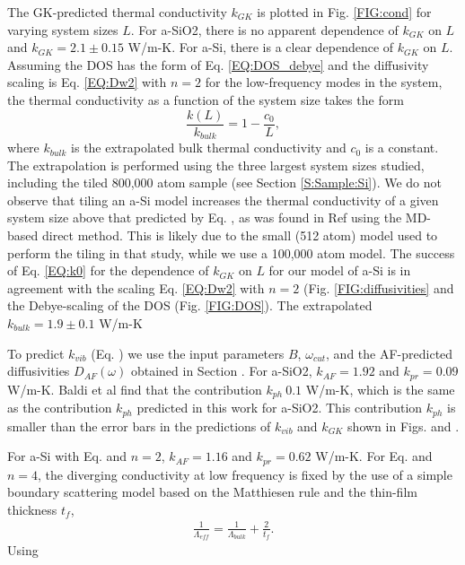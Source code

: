 \documentclass[aps,prb,onecolumn,preprint,superscriptaddress,footinbib,amsmath,amssymb,floatfix]{revtex4}
\begin{document}
The GK-predicted thermal conductivity $k_{GK}$ is plotted in 
Fig. \ref{FIG:cond} for 
varying system sizes $L$. For a-SiO2, there is no apparent dependence 
of $k_{GK}$ on $L$ and $k_{GK}=2.1 \pm 0.15$ W/m-K. 
For a-Si, there is a clear dependence of $k_{GK}$ on 
$L$. Assuming the DOS has the form of Eq. \eqref{EQ:DOS_debye} 
and the diffusivity scaling 
is Eq. \eqref{EQ:Dw2} with $n=2$ 
for the low-frequency modes in the system, 
the thermal conductivity as a function of the system size 
takes the form
\begin{equation}\label{EQ:k0}
\frac{k(L)}{k_{bulk}} = 1 - \frac{c_0}{L},
\end{equation}
where $k_{bulk}$ is the extrapolated bulk thermal conductivity and $c_0$ 
is a constant.\cite{shiomi_thermal_2011,esfarjani_heat_2011} 
The extrapolation is performed using the three largest 
system sizes studied, including the tiled 800,000 atom sample (see 
Section \ref{S:Sample:Si}). 
We do not observe that tiling an a-Si model increases 
the thermal 
conductivity of a given system size above that predicted by Eq. , as 
was found in Ref  using the MD-based 
direct method. This is likely due to the 
small (512 atom) model used to perform the tiling in that study, 
while we use a 100,000 atom model. 
The success of 
Eq. \eqref{EQ:k0} for the dependence of $k_{GK}$ on 
$L$ for our model of a-Si is in 
agreement with the scaling Eq. \eqref{EQ:Dw2} with $n=2$ 
(Fig. \ref{FIG:diffusivities} 
and the Debye-scaling of the DOS (Fig. \ref{FIG:DOS}). 
The extrapolated $k_{bulk} = 1.9 \pm 0.1$ W/m-K

To predict $k_{vib}$ (Eq. ) we use the input parameters 
$B$, $\omega_{cut}$, and the AF-predicted diffusivities 
$D_{AF}(\omega)$ obtained in Section . 
For a-SiO2, $k_{AF} = 1.92$ and $k_{pr} = 0.09$ W/m-K. 
Baldi et al find that the contribution $k_{ph}~0.1$ W/m-K, which is 
the same as the contribution $k_{ph}$ predicted in this work for 
a-SiO2. This contribution 
$k_{ph}$ is smaller than the error bars in the predictions of $k_{vib}$ 
and $k_{GK}$ shown in Figs. and .  


For a-Si with Eq. and $n=2$, 
$k_{AF} = 1.16$ and $k_{pr} = 0.62$ W/m-K. For Eq. and $n=4$, the 
diverging conductivity at low frequency is fixed by the 
use of a simple boundary scattering model based on the Matthiesen 
rule and the thin-film thickness $t_f$,\cite{sellan_cross-plane_2010} 
\begin{equation}\label{EQ:LambdaMatth}
\begin{split}
\frac{1}{\Lambda_{eff}} = \frac{1}{\Lambda_{bulk}} + 
\frac{2}{t_f}.
\end{split}
\end{equation}
Using 
\end{document}
